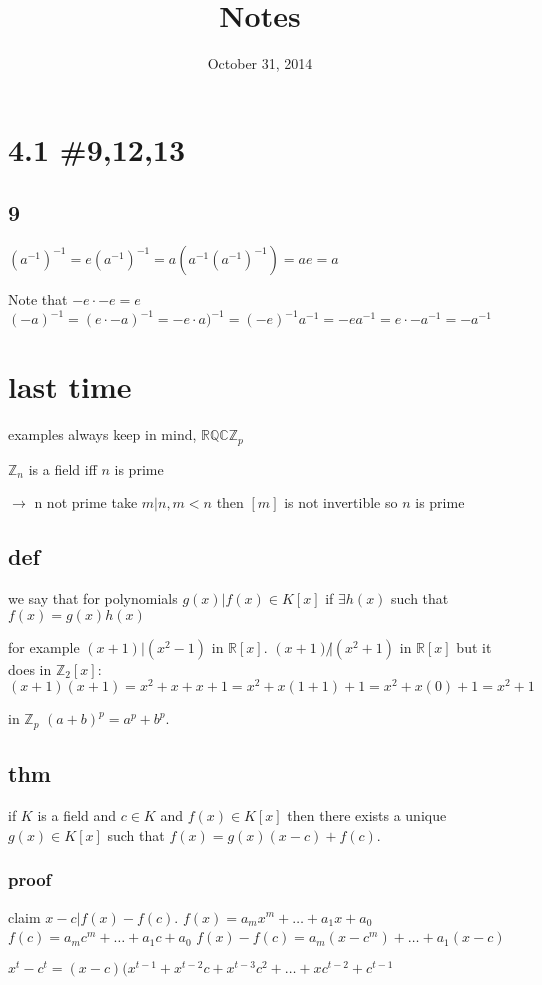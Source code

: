 \documentclass[letterpaper]{article}
\begin{document}
\title{Notes}
\date{October 31, 2014}
\maketitle
\section*{4.1 \#9,12,13}
\subsection*{9}
$(a^{-1})^{-1}=e(a^{-1})^{-1}=a(a^{-1}(a^{-1})^{-1})=ae=a$

Note that $-e\cdot-e=e$
$(-a)^{-1}=(e\cdot -a)^{-1}=-e\cdot a)^{-1}=(-e)^{-1}a^{-1}=-ea^{-1}=e\cdot-a^{-1}=-a^{-1}$

\section*{last time}
examples always keep in mind, $\mathbb{R}\mathbb{Q} \mathbb{C}\mathbb{Z}_p$

$\mathbb{Z}_n$ is a field iff $n$ is prime

$\to$ n not prime take $m|n, m<n$ then $[m]$ is not invertible so $n$ is prime 


\subsection*{def}
we say that for polynomials $g(x)|f(x)\in K[x]$ if $\exists h(x)$ such that $f(x)=g(x)h(x)$

for example $(x+1)|(x^2-1)$ in $\mathbb{R}[x]$. $(x+1)\not|(x^2+1)$ in $\mathbb{R}[x]$ but it does in $\mathbb{Z}_2[x]$: $(x+1)(x+1)=x^2+x+x+1=x^2+x(1+1)+1=x^2+x(0)+1=x^2+1$

in $\mathbb{Z}_p$ $(a+b)^p=a^p+b^p$.

\subsection*{thm}
if $K$ is a field and $c\in K$ and $f(x)\in K[x]$ then there exists a unique $g(x)\in K[x]$ such that $f(x)=g(x)(x-c)+f(c)$.
\subsubsection*{proof}
claim $x-c|f(x)-f(c)$.
$f(x)=a_mx^m+\dots+a_1x+a_0$
$f(c)=a_mc^m+\dots+a_1c+a_0$
$f(x)-f(c)=a_m(x-c^m)+\dots+a_1(x-c)$

$x^t-c^t=(x-c)(x^{t-1}+x^{t-2}c+x^{t-3}c^2+\dots+xc^{t-2}+c^{t-1}$
\end{document}
